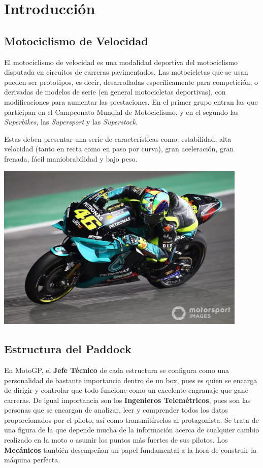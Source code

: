 \documentclass[12pt, letterpaper,spanish]{article}
\theoremstyle{definition}
\theoremstyle{remark}
\begin{document}
\section{Introducción}

	\subsection{Motociclismo de Velocidad}
	El motociclismo de velocidad es una modalidad deportiva del motociclismo disputada en circuitos de carreras pavimentados. Las motocicletas que se usan pueden ser prototipos, es decir, desarrolladas específicamente para competición, o derivadas de modelos de serie (en general motocicletas deportivas), con modificaciones para aumentar las prestaciones. En el primer grupo entran las que participan en el Campeonato Mundial de Motociclismo, y en el segundo las \emph{Superbikes}, las \emph{Supersport} y las \emph{Superstock}.
	
	Estas deben presentar una serie de características como: estabilidad, alta velocidad (tanto en recta como en paso por curva), gran aceleración, gran frenada, fácil maniobrabilidad y bajo peso.
	
	\begin{center}
		\includegraphics[width = 12cm]{imagen1} 
	\end{center}	
	
	\subsection{Estructura del Paddock}
	 En MotoGP, el \textbf{Jefe Técnico} de cada estructura se configura como una personalidad de bastante importancia dentro de un box, pues es quien se encarga de dirigir y controlar que todo funcione como un excelente engranaje que gane carreras. De igual importancia son los \textbf{Ingenieros Telemétricos}, pues son las personas que se encargan de analizar, leer y comprender todos los datos proporcionados por el piloto, así como transmitírselos al protagonista. Se trata de una figura de la que depende mucha de la información acerca de cualquier cambio realizado en la moto o asumir los puntos más fuertes de sus pilotos. Los \textbf{Mecánicos} también desempeñan un papel fundamental a la hora de construir la máquina perfecta.
\end{document}
